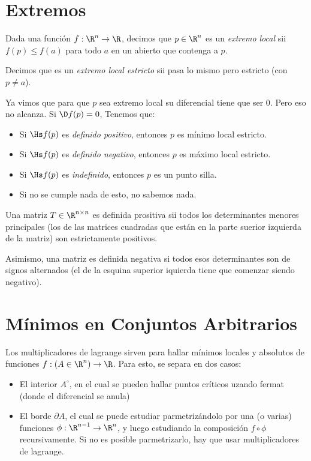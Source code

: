 \documentclass{article}
\begin{document}
    \section*{Extremos}
    \begin{defi}
        Dada una función $f : \R^n \to \R$, decimos que $p \in \R^n$ es un \emph{extremo local} sii $f(p) \leq f(a)$ para todo $a$ en un abierto que contenga a $p$.

        Decimos que es un \emph{extremo local estricto} sii pasa lo mismo pero estricto (con $p \neq a$).
    \end{defi}
    \begin{teo}
        Ya vimos que para que $p$ sea extremo local su diferencial tiene que ser $0$. Pero eso no alcanza. Si $\D f(p) = 0$, Tenemos que:
        \begin{itemize}
            \item Si $\Hs f(p)$ es \emph{definido positivo}, entonces $p$ es mínimo local estricto.
            \item Si $\Hs f(p)$ es \emph{definido negativo}, entonces $p$ es máximo local estricto.
            \item Si $\Hs f(p)$ es \emph{indefinido}, entonces $p$ es un punto silla.
            \item Si no se cumple nada de esto, no sabemos nada.
        \end{itemize}
    \end{teo}
    \begin{teo}
        Una matriz $T \in \R^{n \times n}$ es definida prositiva sii todos los determinantes menores principales (los de las matrices cuadradas que están en la parte suerior izquierda de la matriz) son estrictamente positivos.

        Asimismo, una matriz es definida negativa si todos esos determinantes son de signos alternados (el de la esquina superior iquierda tiene que comenzar siendo negativo).
    \end{teo}
    \section*{Mínimos en Conjuntos Arbitrarios}
    Los multiplicadores de lagrange sirven para hallar mínimos locales y absolutos de funciones $f : (A \in \R^n) \to \R$. Para esto, se separa en dos casos:
    \begin{itemize}
        \item El interior $A^\circ$, en el cual se pueden hallar puntos críticos uzando fermat (donde el diferencial se anula)
    \item El borde $\partial A$, el cual se puede estudiar parmetrizándolo por una (o varias) funciones $\phi : \R^{n-1} \to \R^n$, y luego estudiando la composición $f \circ \phi$ recursivamente. Si no es posible parmetrizarlo, hay que usar multiplicadores de lagrange.
    \end{itemize}
\end{document}
